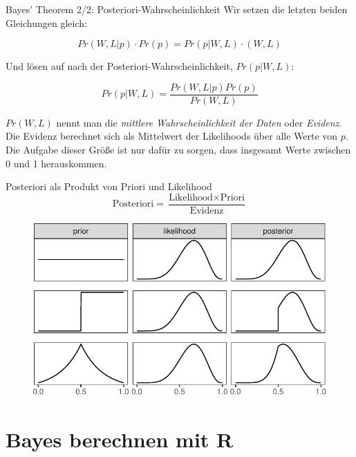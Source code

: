 \documentclass[
  ngerman,
  ignorenonframetext,
]{beamer}
\begin{document}
\begin{frame}{Bayes' Theorem 2/2: Posteriori-Wahrscheinlichkeit}
\protect\hypertarget{bayes-theorem-22-posteriori-wahrscheinlichkeit}{}
Wir setzen die letzten beiden Gleichungen gleich:

\[Pr(W,L|p) \cdot Pr(p) = Pr(p|W,L) \cdot (W,L)\]

Und lösen auf nach der Posteriori-Wahrscheinlichkeit, \(Pr(p|W,L)\):

\[Pr(p|W,L) = \frac{Pr(W,L|p) Pr(p)}{Pr(W,L)}\]

\(Pr(W,L)\) nennt man die \emph{mittlere Wahrscheinlichkeit der Daten}
oder \emph{Evidenz}. Die Evidenz berechnet sich als Mittelwert der
Likelihoods über alle Werte von \(p\). Die Aufgabe dieser Größe ist nur
dafür zu sorgen, dass insgesamt Werte zwischen 0 und 1 herauskommen.
\end{frame}

\begin{frame}{Posteriori als Produkt von Priori und Likelihood}
\protect\hypertarget{posteriori-als-produkt-von-priori-und-likelihood}{}
\[\text{Posteriori} = \frac{\text{Likelihood} \times \text{Priori}}{\text{Evidenz}}\]

\begin{figure}[H]
\includegraphics[width=0.7\linewidth]{unnamed-chunk-24-1} \end{figure}
\end{frame}

\hypertarget{bayes-berechnen-mit-r}{%
\section{Bayes berechnen mit R}\label{bayes-berechnen-mit-r}}
\end{document}
